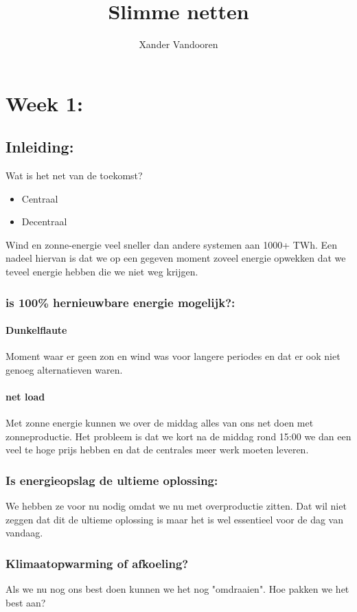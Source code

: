 \documentclass[12pt]{article}
\begin{document}
\begin{titlepage}
    \author{Xander Vandooren}
    \title{Slimme netten}
\end{titlepage}
\maketitle
\newpage
\tableofcontents
\newpage
{}
\section{Week 1:}
\subsection{Inleiding:}
Wat is het net van de toekomst?
\begin{itemize}
    \item Centraal 
    \item Decentraal
\end{itemize}
Wind en zonne-energie veel sneller dan andere systemen aan 1000+ TWh. Een nadeel hiervan is dat we op een gegeven moment zoveel energie opwekken dat we teveel energie hebben die we niet weg krijgen.
\subsubsection{is 100\% hernieuwbare energie mogelijk?:}
\paragraph{Dunkelflaute}
Moment waar er geen zon en wind was voor langere periodes en dat er ook niet genoeg alternatieven waren.
\paragraph{net load}
Met zonne energie kunnen we over de middag alles van ons net doen met zonneproductie. Het probleem is dat we kort na de middag rond 15:00 we dan een veel te hoge prijs hebben en dat de centrales meer werk moeten leveren.
\subsubsection{Is energieopslag de ultieme oplossing:}
We hebben ze voor nu nodig omdat we nu met overproductie zitten. Dat wil niet zeggen dat dit de ultieme oplossing is maar het is wel essentieel voor de dag van vandaag.
\subsubsection{Klimaatopwarming of afkoeling?}
Als we nu nog ons best doen kunnen we het nog "omdraaien". Hoe pakken we het best aan?\newline
\end{document}
